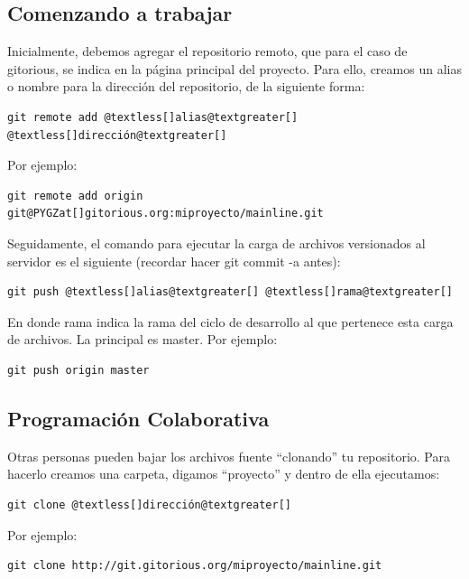 \documentclass[letterpaper,12pt,spanish]{manual}
\begin{document}
\subsection{Comenzando a trabajar}

Inicialmente, debemos agregar el repositorio remoto, que para el caso de gitorious, se indica en la página principal del proyecto. Para ello, creamos un alias o nombre para la dirección del repositorio, de la siguiente forma:

\begin{Verbatim}[commandchars=@\[\]]
git remote add @textless[]alias@textgreater[] @textless[]dirección@textgreater[]
\end{Verbatim}

Por ejemplo:

\begin{Verbatim}[commandchars=@\[\]]
git remote add origin git@PYGZat[]gitorious.org:miproyecto/mainline.git
\end{Verbatim}

Seguidamente, el comando para ejecutar la carga de archivos versionados al servidor es el siguiente (recordar hacer git commit -a antes):

\begin{Verbatim}[commandchars=@\[\]]
git push @textless[]alias@textgreater[] @textless[]rama@textgreater[]
\end{Verbatim}

En donde rama indica la rama del ciclo de desarrollo al que pertenece esta carga de archivos. La principal es master. Por ejemplo:

\begin{Verbatim}[commandchars=@\[\]]
git push origin master
\end{Verbatim}


\subsection{Programación Colaborativa}

Otras personas pueden bajar los archivos fuente “clonando” tu repositorio. Para hacerlo creamos una carpeta, digamos “proyecto” y dentro de ella ejecutamos:

\begin{Verbatim}[commandchars=@\[\]]
git clone @textless[]dirección@textgreater[]
\end{Verbatim}

Por ejemplo:

\begin{Verbatim}[commandchars=@\[\]]
git clone http://git.gitorious.org/miproyecto/mainline.git
\end{Verbatim}
\end{document}

